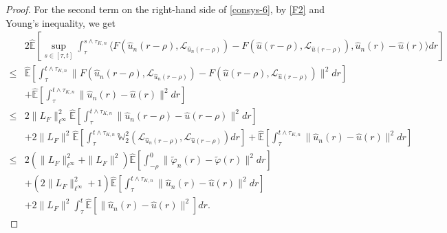 \documentclass[11pt]{article}
\numberwithin{equation}{section}
\theoremstyle{plain}
\begin{document}
\begin{proof}
  For the second term on the right-hand side of \eqref{consys-6},
  by \eqref{F2} and Young's inequality, we get
  \begin{align}\label{consys-8}
       & 2 \widehat{\mathbb{E}}
                \left[ \sup_{s \in [\tau,t]}
                          \int_{\tau}^{s \wedge \tau_{K,n}}
                              \langle F(\hat{u}_n(r-\rho), \mathcal{L}_{\hat{u}_n(r-\rho)})
                                      - F(\hat{u}(r-\rho), \mathcal{L}_{\hat{u}(r-\rho)}),
                                      \hat{u}_n(r) - \hat{u}(r)
                              \rangle dr
                \right] \nonumber\\
 \le & \widehat{\mathbb{E}}
               \left[ \int_{\tau}^{t \wedge \tau_{K,n}}
                            \| F(\hat{u}_n(r-\rho), \mathcal{L}_{\hat{u}_n(r-\rho)})
                               - F(\hat{u}(r-\rho), \mathcal{L}_{\hat{u}(r-\rho)})\|^2 dr
               \right]  \nonumber\\
      & + \widehat{\mathbb{E}}
                 \left[ \int_{\tau}^{t \wedge \tau_{K,n}}
                              \| \hat{u}_n(r) - \hat{u}(r) \|^2 dr
                 \right]  \nonumber\\
 \le & 2 \|L_F\|_{\ell^\infty}^2 \widehat{\mathbb{E}}
              \left[ \int_{\tau}^{t \wedge \tau_{K,n}}
                            \|\hat{u}_n(r-\rho) - \hat{u}(r-\rho)\|^2 dr
              \right]  \nonumber\\
      & + 2 \|L_F\|^2 \widehat{\mathbb{E}}
                \left[ \int_{\tau}^{t \wedge \tau_{K,n}}
                             \mathbb{W}_2^2(\mathcal{L}_{\hat{u}_n(r-\rho)},\mathcal{L}_{\hat{u}(r-\rho)} )dr
                \right]
          + \widehat{\mathbb{E}}
                 \left[ \int_{\tau}^{t \wedge \tau_{K,n}}
                              \| \hat{u}_n(r) - \hat{u}(r) \|^2 dr
                 \right]  \nonumber\\
 \le & 2 \left( \|L_F\|_{\ell^\infty}^2 + \|L_F\|^2 \right)
              \widehat{\mathbb{E}}
              \left[ \int_{-\rho}^{0}
                           \|\widetilde{\varphi}_n(r) - \widetilde{\varphi}(r)\|^2 dr
              \right]  \nonumber\\
      & + \left( 2 \|L_F\|_{\ell^\infty}^2  
          + 1 \right)
              \widehat{\mathbb{E}}
                    \left[ \int_{\tau}^{t \wedge \tau_{K,n}}
                              \| \hat{u}_n(r) - \hat{u}(r) \|^2 dr 
                    \right]  \nonumber\\
      & + 2 \|L_F\|^2  
                \int_{\tau}^{t  }
                    \widehat{\mathbb{E}}
                         \left[ \| \hat{u}_n(r) - \hat{u}(r) \|^2 \right] dr.
    \end{align}
 

\end{proof}
\end{document}
